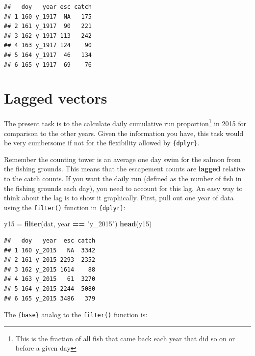 \documentclass[]{book}
\newenvironment{Shaded}{\begin{snugshade}}{\end{snugshade}}
\newcommand{\CommentTok}[1]{\textcolor[rgb]{0.56,0.35,0.01}{\textit{#1}}}
\newcommand{\KeywordTok}[1]{\textcolor[rgb]{0.13,0.29,0.53}{\textbf{#1}}}
\newcommand{\NormalTok}[1]{#1}
\newcommand{\OperatorTok}[1]{\textcolor[rgb]{0.81,0.36,0.00}{\textbf{#1}}}
\newcommand{\StringTok}[1]{\textcolor[rgb]{0.31,0.60,0.02}{#1}}
\let\rmarkdownfootnote\footnote%
\def\footnote{\protect\rmarkdownfootnote}
\begin{document}
\begin{verbatim}
##   doy   year esc catch
## 1 160 y_1917  NA   175
## 2 161 y_1917  90   221
## 3 162 y_1917 113   242
## 4 163 y_1917 124    90
## 5 164 y_1917  46   134
## 6 165 y_1917  69    76
\end{verbatim}

\hypertarget{lagged-vectors}{%
\section{Lagged vectors}\label{lagged-vectors}}

The present task is to the calculate daily cumulative run proportion\footnote{This is the fraction of all fish that came back each year that did so on or before a given day} in 2015 for comparison to the other years. Given the information you have, this task would be very cumbersome if not for the flexibility allowed by \texttt{\{dplyr\}}.

Remember the counting tower is an average one day swim for the salmon from the fishing grounds. This means that the escapement counts are \textbf{lagged} relative to the catch counts. If you want the daily run (defined as the number of fish in the fishing grounds each day), you need to account for this lag. An easy way to think about the lag is to show it graphically. First, pull out one year of data using the \texttt{filter()} function in \texttt{\{dplyr\}}:

\begin{Shaded}
\begin{Highlighting}[]
\NormalTok{y15 =}\StringTok{ }\KeywordTok{filter}\NormalTok{(dat, year }\OperatorTok{==}\StringTok{ "y_2015"}\NormalTok{)}
\KeywordTok{head}\NormalTok{(y15)}
\end{Highlighting}
\end{Shaded}

\begin{verbatim}
##   doy   year  esc catch
## 1 160 y_2015   NA  3342
## 2 161 y_2015 2293  2352
## 3 162 y_2015 1614    88
## 4 163 y_2015   61  3270
## 5 164 y_2015 2244  5080
## 6 165 y_2015 3486   379
\end{verbatim}

The \texttt{\{base\}} analog to the \texttt{filter()} function is:

\begin{Shaded}
\end{Shaded}
\end{document}
